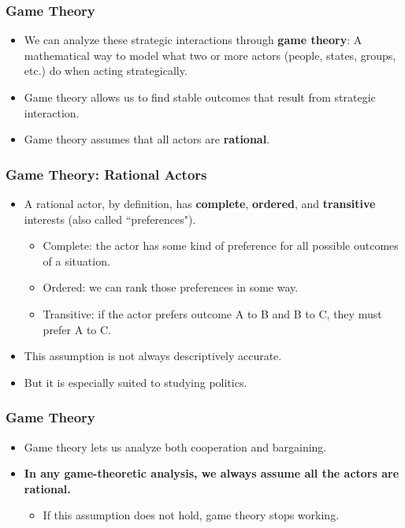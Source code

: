 \documentclass[handout]{beamer}
\begin{document}
 \begin{frame} 
 \frametitle{\LARGE{Game Theory}}
    \begin{itemize}
         \item We can analyze these strategic interactions through \textbf{game theory}: A mathematical way to model what two or more actors (people, states, groups, etc.) do when acting strategically. \pause  
         \item Game theory allows us to find stable outcomes that result from strategic interaction. \pause 
         \item Game theory assumes that all actors are \textbf{rational}.
     \end{itemize}
 \end{frame}

\begin{frame} 
	\frametitle{\LARGE{Game Theory: Rational Actors}}
	\begin{itemize}
		\item A rational actor, by definition, has \textbf{complete}, \textbf{ordered}, and \textbf{transitive} interests (also called ``preferences"). \pause 
		\begin{itemize}
			\item Complete: the actor has some kind of preference for all possible outcomes of a situation. \pause
			\item Ordered: we can rank those preferences in some way. \pause
			\item Transitive: if the actor prefers outcome A to B and B to C, they must prefer A to C. \pause 
		\end{itemize}
		\item This assumption is not always descriptively accurate. \pause 
		\item But it is especially suited to studying politics. 
	\end{itemize}
\end{frame}

 \begin{frame} 
	\frametitle{\LARGE{Game Theory}}
	\begin{itemize}
		\item Game theory lets us analyze both cooperation and bargaining. \pause
		\item \textbf{In any game-theoretic analysis, we always assume all the actors are rational.}
		\begin{itemize}
			\item If this assumption does not hold, game theory stops working.
		\end{itemize}
	\end{itemize}
\end{frame}
\end{document}
